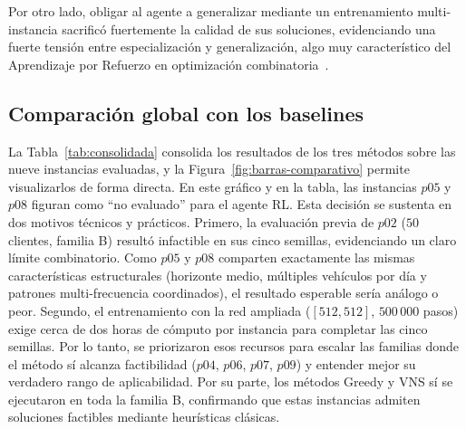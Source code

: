 Por otro lado, obligar al agente a generalizar mediante un entrenamiento multi-instancia sacrificó fuertemente la calidad de sus soluciones, evidenciando una fuerte tensión entre especialización y generalización, algo muy característico del Aprendizaje por Refuerzo en optimización combinatoria~\cite{nazari2018reinforcementlearningsolvingvehicle}.

\subsection{Comparación global con los baselines} \label{sec:comparacion-global}
La Tabla~\ref{tab:consolidada} consolida los resultados de los tres métodos sobre las nueve instancias evaluadas, y la Figura~\ref{fig:barras-comparativo} permite visualizarlos de forma directa. En este gráfico y en la tabla, las instancias $p05$ y $p08$ figuran como \enquote{no evaluado} para el agente RL. Esta decisión se sustenta en dos motivos técnicos y prácticos. Primero, la evaluación previa de $p02$ ($50$ clientes, familia B) resultó infactible en sus cinco semillas, evidenciando un claro límite combinatorio. Como $p05$ y $p08$ comparten exactamente las mismas características estructurales (horizonte medio, múltiples vehículos por día y patrones multi-frecuencia coordinados), el resultado esperable sería análogo o peor. Segundo, el entrenamiento con la red ampliada ($[512, 512]$, $500\,000$ pasos) exige cerca de dos horas de cómputo por instancia para completar las cinco semillas. Por lo tanto, se priorizaron esos recursos para escalar las familias donde el método sí alcanza factibilidad ($p04$, $p06$, $p07$, $p09$) y entender mejor su verdadero rango de aplicabilidad. Por su parte, los métodos Greedy y VNS sí se ejecutaron en toda la familia B, confirmando que estas instancias admiten soluciones factibles mediante heurísticas clásicas.

